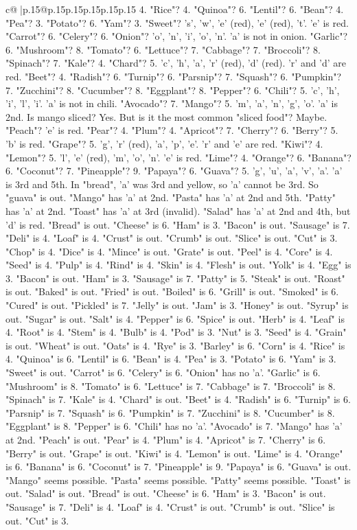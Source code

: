 \documentclass{article}
\begin{document}
{\begin{supertabular}{c@{$\;$}|p{.15\linewidth}@{}p{.15\linewidth}p{.15\linewidth}p{.15\linewidth}p{.15\linewidth}p{.15\linewidth}}
{{{4. "Rice"? 4. "Quinoa"? 6. "Lentil"? 6. "Bean"? 4. "Pea"? 3. "Potato"? 6. "Yam"? 3. "Sweet"? 's', 'w', 'e' (red), 'e' (red), 't'. 'e' is red. "Carrot"? 6. "Celery"? 6. "Onion"? 'o', 'n', 'i', 'o', 'n'. 'a' is not in onion. "Garlic"? 6. "Mushroom"? 8. "Tomato"? 6. "Lettuce"? 7. "Cabbage"? 7. "Broccoli"? 8. "Spinach"? 7. "Kale"? 4. "Chard"? 5. 'c', 'h', 'a', 'r' (red), 'd' (red). 'r' and 'd' are red. "Beet"? 4. "Radish"? 6. "Turnip"? 6. "Parsnip"? 7. "Squash"? 6. "Pumpkin"? 7. "Zucchini"? 8. "Cucumber"? 8. "Eggplant"? 8. "Pepper"? 6. "Chili"? 5. 'c', 'h', 'i', 'l', 'i'. 'a' is not in chili. "Avocado"? 7. "Mango"? 5. 'm', 'a', 'n', 'g', 'o'. 'a' is 2nd. Is mango sliced? Yes. But is it the most common "sliced food"? Maybe. "Peach"? 'e' is red. "Pear"? 4. "Plum"? 4. "Apricot"? 7. "Cherry"? 6. "Berry"? 5. 'b' is red. "Grape"? 5. 'g', 'r' (red), 'a', 'p', 'e'. 'r' and 'e' are red. "Kiwi"? 4. "Lemon"? 5. 'l', 'e' (red), 'm', 'o', 'n'. 'e' is red. "Lime"? 4. "Orange"? 6. "Banana"? 6. "Coconut"? 7. "Pineapple"? 9. "Papaya"? 6. "Guava"? 5. 'g', 'u', 'a', 'v', 'a'. 'a' is 3rd and 5th. In "bread", 'a' was 3rd and yellow, so 'a' cannot be 3rd. So "guava" is out. "Mango" has 'a' at 2nd. "Pasta" has 'a' at 2nd and 5th. "Patty" has 'a' at 2nd. "Toast" has 'a' at 3rd (invalid). "Salad" has 'a' at 2nd and 4th, but 'd' is red. "Bread" is out. "Cheese" is 6. "Ham" is 3. "Bacon" is out. "Sausage" is 7. "Deli" is 4. "Loaf" is 4. "Crust" is out. "Crumb" is out. "Slice" is out. "Cut" is 3. "Chop" is 4. "Dice" is 4. "Mince" is out. "Grate" is out. "Peel" is 4. "Core" is 4. "Seed" is 4. "Pulp" is 4. "Rind" is 4. "Skin" is 4. "Flesh" is out. "Yolk" is 4. "Egg" is 3. "Bacon" is out. "Ham" is 3. "Sausage" is 7. "Patty" is 5. "Steak" is out. "Roast" is out. "Baked" is out. "Fried" is out. "Boiled" is 6. "Grill" is out. "Smoked" is 6. "Cured" is out. "Pickled" is 7. "Jelly" is out. "Jam" is 3. "Honey" is out. "Syrup" is out. "Sugar" is out. "Salt" is 4. "Pepper" is 6. "Spice" is out. "Herb" is 4. "Leaf" is 4. "Root" is 4. "Stem" is 4. "Bulb" is 4. "Pod" is 3. "Nut" is 3. "Seed" is 4. "Grain" is out. "Wheat" is out. "Oats" is 4. "Rye" is 3. "Barley" is 6. "Corn" is 4. "Rice" is 4. "Quinoa" is 6. "Lentil" is 6. "Bean" is 4. "Pea" is 3. "Potato" is 6. "Yam" is 3. "Sweet" is out. "Carrot" is 6. "Celery" is 6. "Onion" has no 'a'. "Garlic" is 6. "Mushroom" is 8. "Tomato" is 6. "Lettuce" is 7. "Cabbage" is 7. "Broccoli" is 8. "Spinach" is 7. "Kale" is 4. "Chard" is out. "Beet" is 4. "Radish" is 6. "Turnip" is 6. "Parsnip" is 7. "Squash" is 6. "Pumpkin" is 7. "Zucchini" is 8. "Cucumber" is 8. "Eggplant" is 8. "Pepper" is 6. "Chili" has no 'a'. "Avocado" is 7. "Mango" has 'a' at 2nd. "Peach" is out. "Pear" is 4. "Plum" is 4. "Apricot" is 7. "Cherry" is 6. "Berry" is out. "Grape" is out. "Kiwi" is 4. "Lemon" is out. "Lime" is 4. "Orange" is 6. "Banana" is 6. "Coconut" is 7. "Pineapple" is 9. "Papaya" is 6. "Guava" is out. "Mango" seems possible. "Pasta" seems possible. "Patty" seems possible. "Toast" is out. "Salad" is out. "Bread" is out. "Cheese" is 6. "Ham" is 3. "Bacon" is out. "Sausage" is 7. "Deli" is 4. "Loaf" is 4. "Crust" is out. "Crumb" is out. "Slice" is out. "Cut" is 3. }}}
\end{supertabular}}
\end{document}
